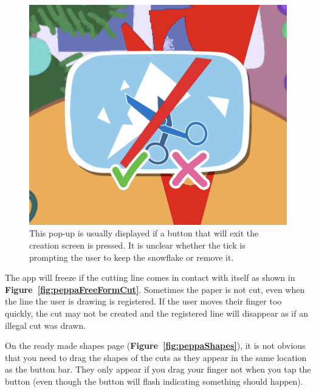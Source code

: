 \documentclass[11pt]{article}
\begin{document}
\begin{figure}[!ht]
                        \begin{minipage}{0.32\textwidth}
                            \centering
                            \includegraphics[width=0.8\linewidth]{Images/peppa/peppaPopUp}
                             \caption{This pop-up is usually displayed if a button that will exit the creation screen is pressed. It is unclear whether the tick is prompting the user to keep the snowflake or remove it.}
                            \label{fig:peppaPopUp}
                        \end{minipage}
                    \end{figure}
                    
                    The app will freeze if the cutting line comes in contact with itself as shown in \textbf{Figure~\ref{fig:peppaFreeFormCut}}. Sometimes the paper is not cut, even when the line the user is drawing is registered. If the user moves their finger too quickly, the cut may not be created and the registered line will disappear as if an illegal cut was drawn.
                    
                    On the ready made shapes page (\textbf{Figure~\ref{fig:peppaShapes}}), it is not obvious that you need to drag the shapes of the cuts as they appear in the same location as the button bar. They only appear if you drag your finger not when you tap the button (even though the button will flash indicating something should happen). 
                    
\end{document}
